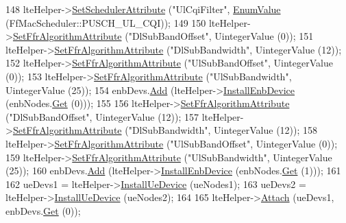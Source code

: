 \begin{DoxyCode}
148   lteHelper->\hyperlink{classns3_1_1LteHelper_a38f8c7f4592b31c0f3dedb53e7909742}{SetSchedulerAttribute} (\textcolor{stringliteral}{"UlCqiFilter"}, 
      \hyperlink{classns3_1_1EnumValue}{EnumValue} (FfMacScheduler::PUSCH\_UL\_CQI));
149 
150   lteHelper->\hyperlink{classns3_1_1LteHelper_a793d56e843a844428851e90752c5f130}{SetFfrAlgorithmAttribute} (\textcolor{stringliteral}{"DlSubBandOffset"}, UintegerValue (0));
151   lteHelper->\hyperlink{classns3_1_1LteHelper_a793d56e843a844428851e90752c5f130}{SetFfrAlgorithmAttribute} (\textcolor{stringliteral}{"DlSubBandwidth"}, UintegerValue (12));
152   lteHelper->\hyperlink{classns3_1_1LteHelper_a793d56e843a844428851e90752c5f130}{SetFfrAlgorithmAttribute} (\textcolor{stringliteral}{"UlSubBandOffset"}, UintegerValue (0));
153   lteHelper->\hyperlink{classns3_1_1LteHelper_a793d56e843a844428851e90752c5f130}{SetFfrAlgorithmAttribute} (\textcolor{stringliteral}{"UlSubBandwidth"}, UintegerValue (25));
154   enbDevs.\hyperlink{classns3_1_1NetDeviceContainer_a7ca8bc1d7ec00fd4fcc63869987fbda5}{Add} (lteHelper->\hyperlink{classns3_1_1LteHelper_a5e009ad35ef85f46b5a6099263f15a03}{InstallEnbDevice} (enbNodes.\hyperlink{classns3_1_1NodeContainer_a9ed96e2ecc22e0f5a3d4842eb9bf90bf}{Get} (0)));
155 
156   lteHelper->\hyperlink{classns3_1_1LteHelper_a793d56e843a844428851e90752c5f130}{SetFfrAlgorithmAttribute} (\textcolor{stringliteral}{"DlSubBandOffset"}, UintegerValue (12));
157   lteHelper->\hyperlink{classns3_1_1LteHelper_a793d56e843a844428851e90752c5f130}{SetFfrAlgorithmAttribute} (\textcolor{stringliteral}{"DlSubBandwidth"}, UintegerValue (12));
158   lteHelper->\hyperlink{classns3_1_1LteHelper_a793d56e843a844428851e90752c5f130}{SetFfrAlgorithmAttribute} (\textcolor{stringliteral}{"UlSubBandOffset"}, UintegerValue (0));
159   lteHelper->\hyperlink{classns3_1_1LteHelper_a793d56e843a844428851e90752c5f130}{SetFfrAlgorithmAttribute} (\textcolor{stringliteral}{"UlSubBandwidth"}, UintegerValue (25));
160   enbDevs.\hyperlink{classns3_1_1NetDeviceContainer_a7ca8bc1d7ec00fd4fcc63869987fbda5}{Add} (lteHelper->\hyperlink{classns3_1_1LteHelper_a5e009ad35ef85f46b5a6099263f15a03}{InstallEnbDevice} (enbNodes.\hyperlink{classns3_1_1NodeContainer_a9ed96e2ecc22e0f5a3d4842eb9bf90bf}{Get} (1)));
161 
162   ueDevs1 = lteHelper->\hyperlink{classns3_1_1LteHelper_ac9cd932d7de92811cfa953c2e3b2fc9f}{InstallUeDevice} (ueNodes1);
163   ueDevs2 = lteHelper->\hyperlink{classns3_1_1LteHelper_ac9cd932d7de92811cfa953c2e3b2fc9f}{InstallUeDevice} (ueNodes2);
164 
165   lteHelper->\hyperlink{classns3_1_1LteHelper_a9466743f826aa2652a87907b7f0a1c87}{Attach} (ueDevs1, enbDevs.\hyperlink{classns3_1_1NetDeviceContainer_a677d62594b5c9d2dea155cc5045f4d0b}{Get} (0));

\end{DoxyCode}
